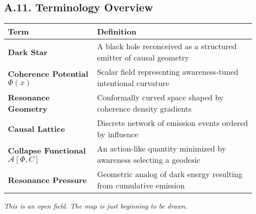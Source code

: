 \subsection*{A.11. Terminology Overview}

\begin{table}[H]
\centering
\begin{tabular}{l p{10cm}}
\toprule
\textbf{Term} & \textbf{Definition} \\
\midrule
\textbf{Dark Star} & A black hole reconceived as a structured emitter of causal geometry \\
\textbf{Coherence Potential} \( \Phi(x) \) & Scalar field representing awareness-tuned intentional curvature \\
\textbf{Resonance Geometry} & Conformally curved space shaped by coherence density gradients \\
\textbf{Causal Lattice} & Discrete network of emission events ordered by influence \\
\textbf{Collapse Functional} \( \mathcal{A}[\Phi, C] \) & An action-like quantity minimized by awareness selecting a geodesic \\
\textbf{Resonance Pressure} & Geometric analog of dark energy resulting from cumulative emission \\
\bottomrule
\end{tabular}
\end{table}

\begin{center}
\emph{This is an open field. The map is just beginning to be drawn.}
\end{center}
